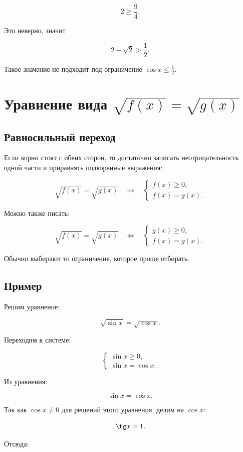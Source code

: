 \documentclass[a4paper,12pt]{article}
\begin{document}
\[
2\ge\frac94.
\]

Это неверно, значит

\[
2-\sqrt2>\frac12.
\]

Такое значение не подходит под ограничение \(\cos x\le\frac12\).

\section{Уравнение вида \(\sqrt{f(x)}=\sqrt{g(x)}\)}

\subsection{Равносильный переход}

Если корни стоят с обеих сторон, то достаточно записать неотрицательность одной части и приравнять подкоренные выражения:

\[
\sqrt{f(x)}=\sqrt{g(x)}
\quad\Longleftrightarrow\quad
\begin{cases}
f(x)\ge0,\\
f(x)=g(x).
\end{cases}
\]

Можно также писать:

\[
\sqrt{f(x)}=\sqrt{g(x)}
\quad\Longleftrightarrow\quad
\begin{cases}
g(x)\ge0,\\
f(x)=g(x).
\end{cases}
\]

Обычно выбирают то ограничение, которое проще отбирать.

\subsection{Пример}

Решим уравнение:

\[
\sqrt{\sin x}=\sqrt{\cos x}.
\]

Переходим к системе:

\[
\begin{cases}
\sin x\ge0,\\
\sin x=\cos x.
\end{cases}
\]

Из уравнения:

\[
\sin x=\cos x.
\]

Так как \(\cos x\ne0\) для решений этого уравнения, делим на \(\cos x\):

\[
\tg x=1.
\]

Отсюда:
\end{document}
